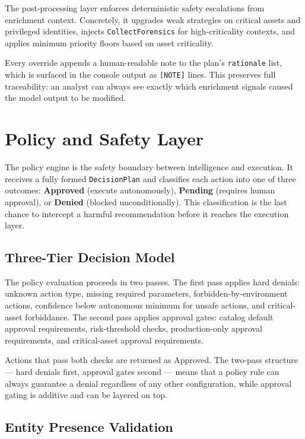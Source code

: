 The post-processing layer enforces deterministic safety escalations from enrichment context. Concretely, it upgrades weak strategies on critical assets and privileged identities, injects \texttt{CollectForensics} for high-criticality contexts, and applies minimum priority floors based on asset criticality.

Every override appends a human-readable note to the plan's \texttt{rationale} list, which is surfaced in the console output as \texttt{[NOTE]} lines. This preserves full traceability: an analyst can always see exactly which enrichment signals caused the model output to be modified.

\section{Policy and Safety Layer}
\label{sec:impl-policy}

The policy engine is the safety boundary between intelligence and execution. It receives a fully formed \texttt{DecisionPlan} and classifies each action into one of three outcomes: \textbf{Approved} (execute autonomously), \textbf{Pending} (requires human approval), or \textbf{Denied} (blocked unconditionally). This classification is the last chance to intercept a harmful recommendation before it reaches the execution layer.

\subsection{Three-Tier Decision Model}

The policy evaluation proceeds in two passes. The first pass applies hard denials: unknown action type, missing required parameters, forbidden-by-environment actions, confidence below autonomous minimum for unsafe actions, and critical-asset forbiddance. The second pass applies approval gates: catalog default approval requirements, risk-threshold checks, production-only approval requirements, and critical-asset approval requirements.

Actions that pass both checks are returned as Approved. The two-pass structure --- hard denials first, approval gates second --- means that a policy rule can always guarantee a denial regardless of any other configuration, while approval gating is additive and can be layered on top.

\subsection{Entity Presence Validation}

